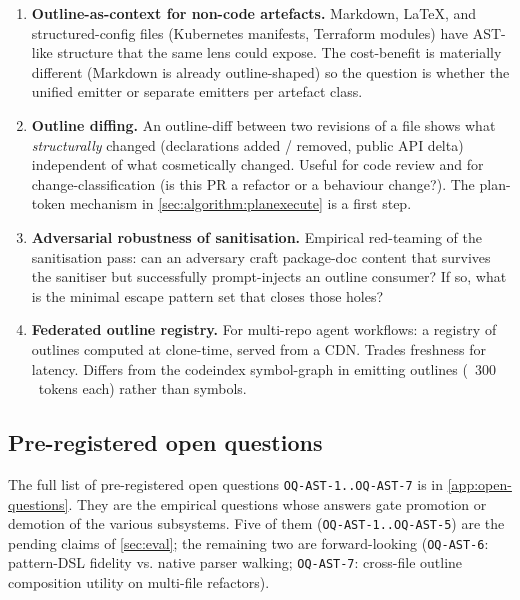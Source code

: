 \begin{enumerate}[leftmargin=*]
  \item \textbf{Outline-as-context for non-code artefacts.}
        Markdown, LaTeX, and structured-config files
        (Kubernetes manifests, Terraform modules) have AST-like
        structure that the same lens could expose. The
        cost-benefit is materially different (Markdown is already
        outline-shaped) so the question is whether the unified
        emitter or separate emitters per artefact class.
  \item \textbf{Outline diffing.} An outline-diff between
        two revisions of a file shows what \emph{structurally}
        changed (declarations added / removed, public API
        delta) independent of what cosmetically changed. Useful
        for code review and for change-classification (is this PR
        a refactor or a behaviour change?). The plan-token
        mechanism in \cref{sec:algorithm:planexecute} is a
        first step.
  \item \textbf{Adversarial robustness of sanitisation.}
        Empirical red-teaming of the sanitisation pass: can an
        adversary craft package-doc content that survives the
        sanitiser but successfully prompt-injects an outline
        consumer? If so, what is the minimal escape pattern set
        that closes those holes?
  \item \textbf{Federated outline registry.} For multi-repo
        agent workflows: a registry of outlines computed at
        clone-time, served from a CDN. Trades freshness for
        latency. Differs from the codeindex symbol-graph in
        emitting outlines (~$300$~tokens each) rather than
        symbols.
\end{enumerate}

\subsection{Pre-registered open questions}

The full list of pre-registered open questions
\texttt{OQ-AST-1..OQ-AST-7} is in \cref{app:open-questions}. They
are the empirical questions whose answers gate promotion or
demotion of the various subsystems. Five of them
(\texttt{OQ-AST-1..OQ-AST-5}) are the pending claims of
\cref{sec:eval}; the remaining two are forward-looking
(\texttt{OQ-AST-6}: pattern-DSL fidelity vs. native parser walking;
\texttt{OQ-AST-7}: cross-file outline composition utility on
multi-file refactors).
